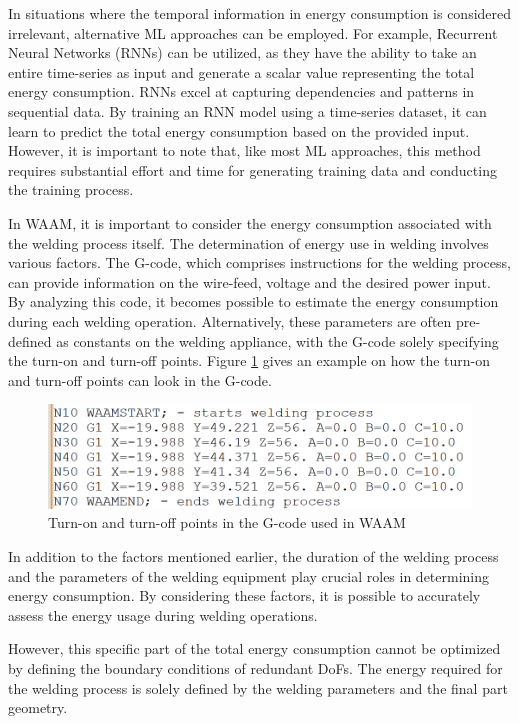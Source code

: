 In situations where the temporal information in energy consumption is considered irrelevant, alternative ML approaches can be employed. For example, Recurrent Neural Networks (RNNs) can be utilized, as they have the ability to take an entire time-series as input and generate a scalar value representing the total energy consumption. RNNs excel at capturing dependencies and patterns in sequential data. By training an RNN model using a time-series dataset, it can learn to predict the total energy consumption based on the provided input. However, it is important to note that, like most ML approaches, this method requires substantial effort and time for generating training data and conducting the training process.

In WAAM, it is important to consider the energy consumption associated with the welding process itself. The determination of energy use in welding involves various factors. The G-code, which comprises instructions for the welding process, can provide information on the wire-feed, voltage and the desired power input. By analyzing this code, it becomes possible to estimate the energy consumption during each welding operation. Alternatively, these parameters are often pre-defined as constants on the welding appliance, with the G-code solely specifying the turn-on and turn-off points. Figure \ref{waamgcode} gives an example on how the turn-on and turn-off points can look in the G-code.
 
\begin{figure}[H]
	\centerline{\includegraphics[width=.75\textwidth]{figures/waamgcode.png}}
	\caption{Turn-on and turn-off points in the G-code used in WAAM}
	\label{waamgcode}
\end{figure}

In addition to the factors mentioned earlier, the duration of the welding process and the parameters of the welding equipment play crucial roles in determining energy consumption. By considering these factors, it is possible to accurately assess the energy usage during welding operations.

However, this specific part of the total energy consumption cannot be optimized by defining the boundary conditions of redundant DoFs. The energy required for the welding process is solely defined by the welding parameters and the final part geometry.


